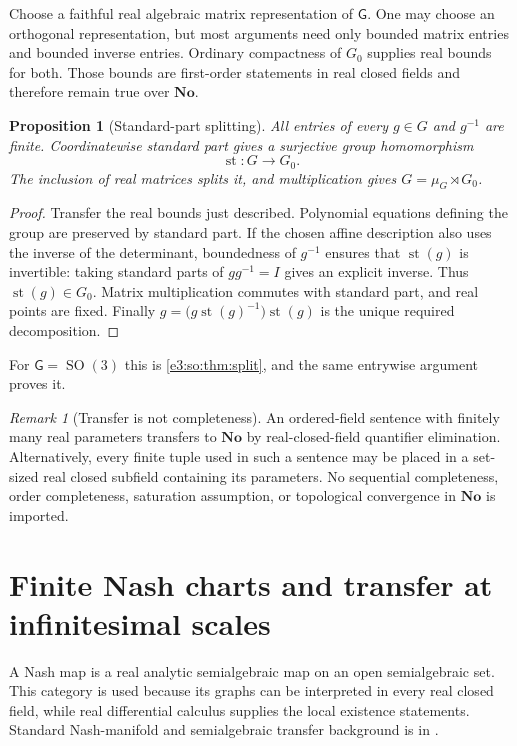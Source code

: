 \documentclass[11pt,letterpaper]{article}
\numberwithin{equation}{section}
\newtheorem{proposition}[proposition]{Proposition}
\theoremstyle{definition}
\theoremstyle{remark}
\newtheorem{remark}[remark]{Remark}
\newcommand{\No}{\mathbf{No}}
\newcommand{\st}{\operatorname{st}}
\newcommand{\SO}{\operatorname{SO}}
\newcommand{\sG}{\mathsf G}
\begin{document}
Choose a faithful real algebraic matrix representation of $\sG$. One may choose
an orthogonal representation, but most arguments need only bounded matrix
entries and bounded inverse entries. Ordinary compactness of $G_0$ supplies
real bounds for both. Those bounds are first-order statements in real closed
fields and therefore remain true over $\No$.

\begin{proposition}[Standard-part splitting]\label{e3:cpt:prop:st}
All entries of every $g\in G$ and $g^{-1}$ are finite. Coordinatewise standard
part gives a surjective group homomorphism
\[
 \st:G\longrightarrow G_0.
\]
The inclusion of real matrices splits it, and multiplication gives
$G=\mu_G\rtimes G_0$.
\end{proposition}
\begin{proof}
Transfer the real bounds just described. Polynomial equations defining the
group are preserved by standard part. If the chosen affine description also
uses the inverse of the determinant, boundedness of $g^{-1}$ ensures that
$\st(g)$ is invertible: taking standard parts of $gg^{-1}=I$ gives an explicit
inverse. Thus $\st(g)\in G_0$. Matrix multiplication commutes with standard
part, and real points are fixed. Finally
$g=\bigl(g\st(g)^{-1}\bigr)\st(g)$ is the unique required decomposition.
\end{proof}

For $\sG=\SO(3)$ this is \cref{e3:so:thm:split}, and the same entrywise argument
proves it.

\begin{remark}[Transfer is not completeness]\label{e3:cpt:rem:transfer}
An ordered-field sentence with finitely many real parameters transfers to
$\No$ by real-closed-field quantifier elimination. Alternatively, every finite
tuple used in such a sentence may be placed in a set-sized real closed subfield
containing its parameters. No sequential completeness, order completeness,
saturation assumption, or topological convergence in $\No$ is imported.
\end{remark}

\section{Finite Nash charts and transfer at infinitesimal scales}\label{e3:cpt:sec:nash}

A Nash map is a real analytic semialgebraic map on an open semialgebraic set.
This category is used because its graphs can be interpreted in every real
closed field, while real differential calculus supplies the local existence
statements. Standard Nash-manifold and semialgebraic transfer background is in
\cite{BCR}.
\end{document}
